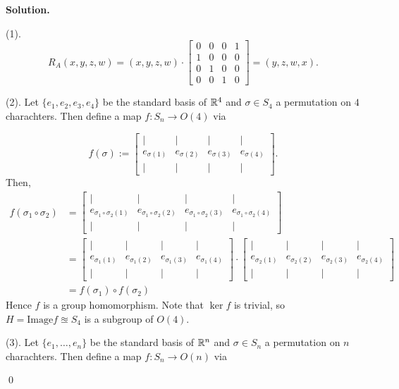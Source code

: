 \documentclass[12pt]{book}
\theoremstyle{definition}
\newenvironment{solution}
{%
  \par\noindent\textbf{Solution.}\quad
}
{%
  \qed\par
}
\begin{document}
\begin{solution}
  (1). 
  \[
  R_A(x,y,z,w) = (x,y,z,w) \cdot \begin{bmatrix}
    0 & 0 & 0 & 1 \\
    1 & 0 & 0 & 0 \\
    0 & 1 & 0 & 0 \\
    0 & 0 & 1 & 0
    \end{bmatrix} = (y, z, w, x).
  \]

  (2). Let $\{e_1, e_2, e_3, e_4\}$ be the standard basis of $\mathbb{R}^4$ and $\sigma \in S_4$ a permutation on $4$ charachters.
  Then define a map $f : S_n \to O(4)$ via

  \[f(\sigma) := 
  \begin{bmatrix}
  | & | & | & | \\
  e_{\sigma(1)} & e_{\sigma(2)} & e_{\sigma(3)} & e_{\sigma(4)} \\
  | & | & | & |
  \end{bmatrix}.
  \]
  Then,
  \[
  \begin{aligned}
    f(\sigma_1 \circ \sigma_2) &= 
  \begin{bmatrix}
  | & | & | & | \\
  e_{\sigma_1 \circ \sigma_2(1)} & e_{\sigma_1 \circ \sigma_2(2)} & e_{\sigma_1 \circ \sigma_2(3)} & e_{\sigma_1 \circ \sigma_2(4)} \\
  | & | & | & |
  \end{bmatrix} \\
  &= \begin{bmatrix}
    | & | & | & | \\
    e_{\sigma_1(1)} & e_{\sigma_1(2)} & e_{\sigma_1(3)} & e_{\sigma_1(4)} \\
    | & | & | & |
    \end{bmatrix} \cdot
    \begin{bmatrix}
      | & | & | & | \\
      e_{\sigma_2(1)} & e_{\sigma_2(2)} & e_{\sigma_2(3)} & e_{\sigma_2(4)} \\
      | & | & | & |
      \end{bmatrix} \\
  &= f(\sigma_1) \circ f(\sigma_2)
  \end{aligned}
  \]
  Hence $f$ is a group homomorphism.
  Note that $\ker{f}$ is trivial, so $H = \text{Image} f \approxeq S_4$ is a subgroup of $O(4)$.

  (3). Let $\{e_1, \dots, e_n\}$ be the standard basis of $\mathbb{R}^n$ and $\sigma \in S_n$ a permutation on $n$ charachters.
  Then define a map $f : S_n \to O(n)$ via


\end{solution}
\end{document}
